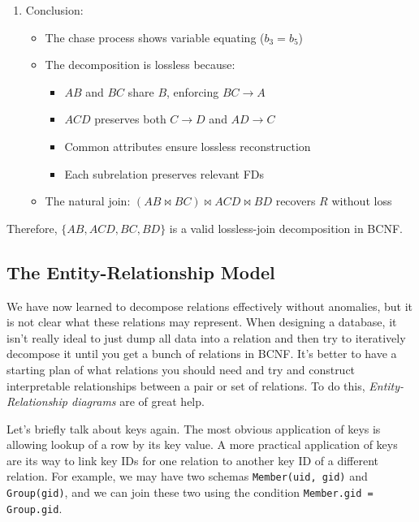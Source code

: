 \begin{example}
\begin{enumerate}
    \item Conclusion:
        \begin{itemize}
        \item The chase process shows variable equating ($b_3 = b_5$)
        \item The decomposition is lossless because:
            \begin{itemize}
            \item $AB$ and $BC$ share $B$, enforcing $BC \rightarrow A$
            \item $ACD$ preserves both $C \rightarrow D$ and $AD \rightarrow C$
            \item Common attributes ensure lossless reconstruction
            \item Each subrelation preserves relevant FDs
            \end{itemize}
        \item The natural join: $(AB \bowtie BC) \bowtie ACD \bowtie BD$ recovers $R$ without loss
        \end{itemize}
    \end{enumerate}

    Therefore, $\{AB, ACD, BC, BD\}$ is a valid lossless-join decomposition in BCNF.
  \end{example}

\subsection{The Entity-Relationship Model} 

    We have now learned to decompose relations effectively without anomalies, but it is not clear what these relations may represent. When designing a database, it isn't really ideal to just dump all data into a relation and then try to iteratively decompose it until you get a bunch of relations in BCNF. It's better to have a starting plan of what relations you should need and try and construct interpretable relationships between a pair or set of relations. To do this, \textit{Entity-Relationship diagrams} are of great help. 

    Let's briefly talk about keys again. The most obvious application of keys is allowing lookup of a row by its key value. A more practical application of keys are its way to link key IDs for one relation to another key ID of a different relation. For example, we may have two schemas \texttt{Member(uid, gid)} and \texttt{Group(gid)}, and we can join these two using the condition \texttt{Member.gid = Group.gid}. 

